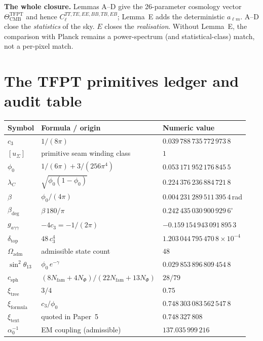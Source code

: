 \documentclass[11pt,a4paper]{article}
\begin{document}
\bigskip

\noindent
\textbf{The whole closure.}  Lemmas A--D give the 26-parameter
cosmology vector
\(\Theta_{\mathrm{CMB}}^{\mathrm{TFPT}}\) and hence
\(C_\ell^{TT,TE,EE,BB,TB,EB}\); Lemma~E adds the deterministic
\(a_{\ell m}\).  A--D close the \emph{statistics} of the sky.
\(E\) closes the \emph{realisation}.  Without Lemma~E, the comparison
with Planck remains a power-spectrum (and statistical-class) match,
not a per-pixel match.

\section{The TFPT primitives ledger and audit table}
\label{sec:ledger}

\begin{center}
\renewcommand{\arraystretch}{1.05}
\begin{tabular}{@{}lll@{}}
\toprule
\textbf{Symbol} & \textbf{Formula / origin} & \textbf{Numeric value} \\
\midrule
\(c_3\)               & \(1/(8\pi)\)
& \(0.039\,788\,735\,772\,973\,8\) \\
\([u_\Sigma]\)            & primitive seam winding class
& \(1\) \\
\(\phi_0\)                 & \(1/(6\pi)+3/(256\pi^4)\)
& \(0.053\,171\,952\,176\,845\,5\) \\
\(\lambda_C\)             & \(\sqrt{\phi_0(1-\phi_0)}\)
& \(0.224\,376\,236\,884\,721\,8\) \\
\(\beta\)  & \(\phi_0/(4\pi)\)
& \(0.004\,231\,289\,511\,395\,4\,\)rad \\
\(\beta_{\mathrm{deg}}\)  & \(\beta\,180/\pi\)
& \(0.242\,435\,030\,900\,929\,6^\circ\) \\
\(g_{a\gamma\gamma}\)     & \(-4c_3=-1/(2\pi)\)
& \(-0.159\,154\,943\,091\,895\,3\) \\
\(\delta_{\mathrm{top}}\) & \(48\,c_3^4\)
& \(1.203\,044\,795\,470\,8\times10^{-4}\) \\
\(\Omega_{\mathrm{adm}}\)& admissible state count
& \(48\) \\
\(\sin^2\theta_{13}\)     & \(\phi_0\,e^{-\gamma}\)
& \(0.029\,853\,896\,809\,454\,8\) \\
\(c_{\mathrm{sph}}\)      & \((8N_{\mathrm{fam}}+4N_\Phi)/(22N_{\mathrm{fam}}+13N_\Phi)\) & \(28/79\) \\
\(\xi_{\mathrm{tree}}\)   & \(3/4\)                                    & \(0.75\) \\
\(\xi_{\mathrm{formula}}\)& \(c_3/\phi_0\)                          & \(0.748\,303\,083\,562\,547\,8\) \\
\(\xi_{\mathrm{text}}\)   & quoted in Paper~5                          & \(0.748\,327\,808\) \\
\(\alpha_0^{-1}\)         & EM coupling (admissible) & \(137.035\,999\,216\) \\
\bottomrule
\end{tabular}
\end{center}
\end{document}
